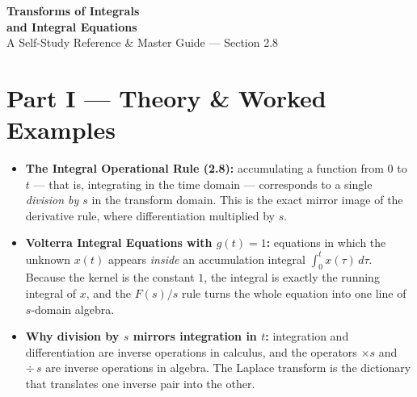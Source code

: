 \documentclass[11pt]{article}
\begin{document}
\begin{center}
    {\Large\bfseries\color{headerblue} Transforms of Integrals\\[2pt] and Integral Equations}\\[6pt]
    \large A Self-Study Reference \& Master Guide --- Section 2.8
\end{center}
\vspace{0.4cm}

\tableofcontents
\vspace{0.8cm}

{}
\section*{Part I --- Theory \& Worked Examples}
\setcounter{section}{2}
\setcounter{subsection}{7}

\begin{topicsbox}
\begin{itemize}[leftmargin=*, itemsep=2pt]
  \item \textbf{The Integral Operational Rule (2.8):} accumulating a function from $0$ to $t$ --- that is, integrating in the time domain --- corresponds to a single \emph{division by $s$} in the transform domain. This is the exact mirror image of the derivative rule, where differentiation multiplied by $s$.
  \item \textbf{Volterra Integral Equations with $g(t)=1$:} equations in which the unknown $x(t)$ appears \emph{inside} an accumulation integral $\int_0^t x(\tau)\,d\tau$. Because the kernel is the constant $1$, the integral is exactly the running integral of $x$, and the $F(s)/s$ rule turns the whole equation into one line of $s$-domain algebra.
  \item \textbf{Why division by $s$ mirrors integration in $t$:} integration and differentiation are inverse operations in calculus, and the operators $\times s$ and $\div\,s$ are inverse operations in algebra. The Laplace transform is the dictionary that translates one inverse pair into the other.
\end{itemize}
\end{topicsbox}
\end{document}
